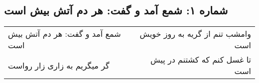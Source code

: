 \begin{center}
\section*{شماره ۱: شمع آمد و گفت: هر دم آتش بیش است}
\label{sec:001}
\begin{longtable}{l p{0.5cm} r}
شمع آمد و گفت: هر دم آتش بیش است
&&
وامشب تنم از گریه به روز خویش است
\\
گر میگریم به زاری زار رواست
&&
تا غسل کنم که کشتنم در پیش است
\\
\end{longtable}
\end{center}
